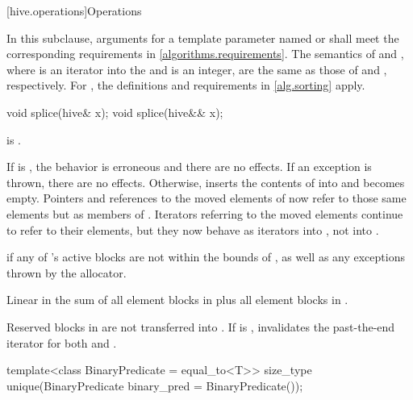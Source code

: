 [hive.operations]{Operations}

\pnum
In this subclause,
arguments for a template parameter
named  or 
shall meet the corresponding requirements in \ref{algorithms.requirements}.
The semantics of  and ,
where  is an iterator into the  and  is an integer,
are the same as those of  and , respectively.
For , the definitions and requirements in \ref{alg.sorting} apply.

%
\begin{itemdecl}
void splice(hive& x);
void splice(hive&& x);
\end{itemdecl}

\begin{itemdescr}
\pnum
\expects
{} is .

\pnum
\effects
If  is ,
the behavior is erroneous and there are no effects.
If an exception is thrown,
there are no effects.
Otherwise, inserts the contents of  into  and
 becomes empty.
Pointers and references to the moved elements of 
now refer to those same elements but as members of .
Iterators referring to the moved elements continue to refer to their elements,
but they now behave as iterators into , not into .

\pnum
\throws
{} if any of 's active blocks
are not within the bounds of ,
as well as any exceptions thrown by the allocator.

\pnum
\complexity
Linear in the sum of
all element blocks in  plus all element blocks in .

\pnum
\remarks
Reserved blocks in  are not transferred into .
If  is ,
invalidates the past-the-end iterator for both  and .
\end{itemdescr}

%
\begin{itemdecl}
template<class BinaryPredicate = equal_to<T>>
  size_type unique(BinaryPredicate binary_pred = BinaryPredicate());
\end{itemdecl}

